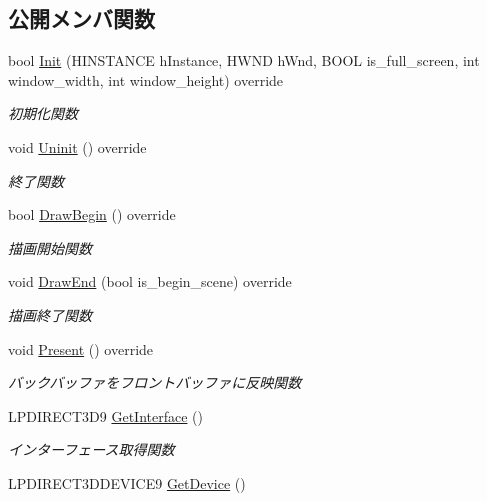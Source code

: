\subsection*{公開メンバ関数}
\begin{DoxyCompactItemize}
\item 
bool \mbox{\hyperlink{class_renderer_direct_x9_af015676b50f3ce1ba7cf20abf6074e3b}{Init}} (H\+I\+N\+S\+T\+A\+N\+CE h\+Instance, H\+W\+ND h\+Wnd, B\+O\+OL is\+\_\+full\+\_\+screen, int window\+\_\+width, int window\+\_\+height) override
\begin{DoxyCompactList}\small\item\em 初期化関数 \end{DoxyCompactList}\item 
void \mbox{\hyperlink{class_renderer_direct_x9_af7ff314cbaa894d71e37c10565002f8f}{Uninit}} () override
\begin{DoxyCompactList}\small\item\em 終了関数 \end{DoxyCompactList}\item 
bool \mbox{\hyperlink{class_renderer_direct_x9_a5113bf4e6aefdb7bcab2016fbbee0174}{Draw\+Begin}} () override
\begin{DoxyCompactList}\small\item\em 描画開始関数 \end{DoxyCompactList}\item 
void \mbox{\hyperlink{class_renderer_direct_x9_a5f934597020f77dc9cf729acfb13a830}{Draw\+End}} (bool is\+\_\+begin\+\_\+scene) override
\begin{DoxyCompactList}\small\item\em 描画終了関数 \end{DoxyCompactList}\item 
void \mbox{\hyperlink{class_renderer_direct_x9_a77dbc76e8adbe4f9ee41c5f09e5ebe81}{Present}} () override
\begin{DoxyCompactList}\small\item\em バックバッファをフロントバッファに反映関数 \end{DoxyCompactList}\item 
L\+P\+D\+I\+R\+E\+C\+T3\+D9 \mbox{\hyperlink{class_renderer_direct_x9_afa6521fe3ae4d5697687197cf5bf3c66}{Get\+Interface}} ()
\begin{DoxyCompactList}\small\item\em インターフェース取得関数 \end{DoxyCompactList}\item 
L\+P\+D\+I\+R\+E\+C\+T3\+D\+D\+E\+V\+I\+C\+E9 \mbox{\hyperlink{class_renderer_direct_x9_a718458c1493c7d6814e01847e2e4164d}{Get\+Device}} ()

\end{DoxyCompactItemize}
